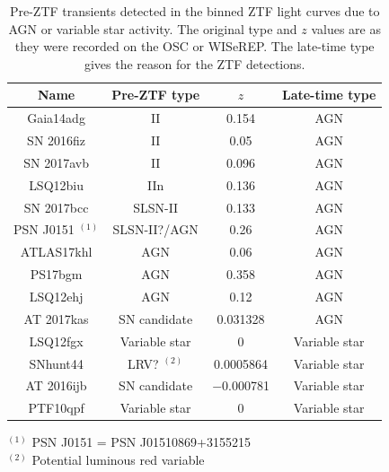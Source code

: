 \documentclass[a4paper,oneside,12pt, class=Latex/Classes/PhDthesisPSnPDF, crop=false]{standalone}
\begin{document}
\begin{table}
    \centering
    \caption[Pre-ZTF transients that were detected due to stellar or AGN variability.]{Pre-ZTF transients detected in the binned ZTF light curves due to AGN or variable star activity. The original type and $z$ values are as they were recorded on the OSC or WISeREP. The late-time type gives the reason for the ZTF detections.}
    \begin{tabular}{cccc}
        \hline
        \hline
        Name & Pre-ZTF type & $z$ & Late-time type\\
        \hline
        Gaia14adg & II & 0.154 & AGN\\
        SN 2016fiz & II & 0.05 & AGN\\
        SN 2017avb & II & 0.096 & AGN\\
        LSQ12biu & IIn & 0.136 & AGN\\
        SN 2017bcc & SLSN-II & 0.133 & AGN\\
        PSN J0151 $^{(1)}$ & SLSN-II?/AGN & 0.26 & AGN\\
        ATLAS17khl & AGN & 0.06 & AGN\\
        PS17bgm & AGN & 0.358 & AGN\\
        LSQ12ehj & AGN & 0.12 & AGN\\
        AT 2017kas & SN candidate & 0.031328 & AGN\\
        LSQ12fgx & Variable star & 0 & Variable star\\
        SNhunt44 & LRV? $^{(2)}$ & 0.0005864 & Variable star\\
        AT 2016ijb & SN candidate & $-$0.000781 & Variable star\\
        PTF10qpf & Variable star & 0 & Variable star\\
        \hline
    \end{tabular}
    \label{non-transient_table}
    \begin{flushleft}
        $^{(1)}$ PSN J0151 = PSN J01510869+3155215\\
        $^{(2)}$ Potential luminous red variable
    \end{flushleft}
\end{table}
\end{document}
